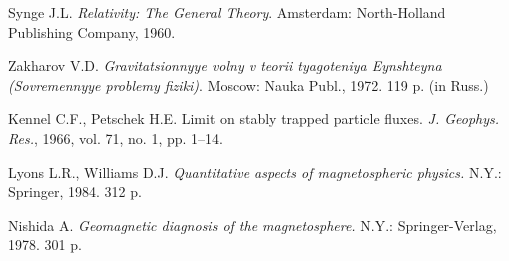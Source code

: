 \begin{otherlanguage}{english}

\begin{thebibliography}{99}

Synge J.L. 
{\it Relativity: The General Theory}. 
Amsterdam: North-Holland Publishing Company, 1960.  

Zakharov V.D. 
{\it Gravitatsionnyye volny v teorii tyagoteniya Eynshteyna (Sovremennyye problemy fiziki)}. 
Moscow: Nauka Publ., 1972. 119 p. (in Russ.)

Kennel C.F., Petschek H.E. 
Limit on stably trapped particle fluxes. 
{\it J. Geophys. Res.}, 1966, vol. 71, no. 1, pp. 1--14.

Lyons L.R., Williams D.J. 
{\it Quantitative aspects of magnetospheric physics.} 
N.Y.: Springer, 1984. 312 p.

Nishida A. 
{\it Geomagnetic diagnosis of the magnetosphere.} 
N.Y.: Springer-Verlag, 1978. 301 p.


\end{thebibliography}

\vspace{10pt}
\begin{otherlanguage}{russian}
\Footer
\end{otherlanguage}

\vspace{10pt}
\FooterSub
\end{otherlanguage}






